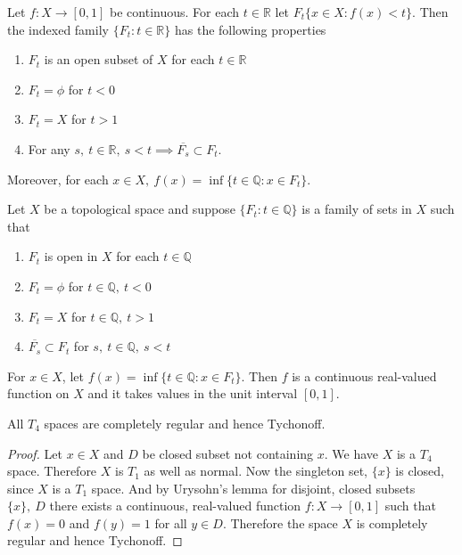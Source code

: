 \begin{lemma}
	Let \( f : X \to [0,1] \) be continuous. For each \( t \in \mathbb{R} \) let \( F_t  \{ x \in X : f(x) < t \} \). Then the indexed family \( \{F_t : t \in \mathbb{R} \} \) has the following properties
	\begin{enumerate}
		\item \( F_t \) is an open subset of \( X \) for each \( t \in \mathbb{R} \)
		\item \( F_t = \phi \) for \( t < 0 \)
		\item \( F_t = X \) for \( t > 1 \)
		\item For any \( s,\ t \in \mathbb{R},\ s < t \implies \overline{F_s} \subset F_t \).
	\end{enumerate}
	Moreover, for each \( x \in X,\ f(x) = \inf \{t \in \mathbb{Q} : x \in F_t \} \).
\end{lemma}

\begin{lemma}
	Let \( X \) be a topological space and suppose \( \{ F_t : t \in \mathbb{Q} \} \) is a family of sets in \( X \) such that 
	\begin{enumerate}
		\item \( F_t \) is open in \( X \) for each \( t \in \mathbb{Q} \)
		\item \( F_t = \phi \) for \( t \in \mathbb{Q},\ t < 0 \)
		\item \( F_t = X \) for \( t \in \mathbb{Q},\ t > 1 \)
		\item \( \overline{F_s} \subset F_t \) for \( s,\ t \in \mathbb{Q},\ s < t \)
	\end{enumerate}
	For \( x \in X \), let \( f(x) = \inf \{ t \in \mathbb{Q} : x \in F_t \} \). Then \( f \) is a continuous real-valued function on \( X \) and it takes values in the unit interval \( [0,1] \).
\end{lemma}

\begin{corollary}
	All \( T_4 \) spaces are completely regular and hence Tychonoff.
\end{corollary}
\begin{proof}
	Let \( x \in X \) and \( D \) be closed subset not containing \( x \). We have \( X \) is a \( T_4 \) space. Therefore \( X \) is \( T_1 \) as well as normal.  Now the singleton set, \( \{ x \} \) is closed, since \( X \) is a \( T_1 \) space. And by Urysohn's lemma for disjoint, closed subsets \( \{ x \},\ D \) there exists a continuous, real-valued function \( f : X \to [0,1] \) such that \( f(x) = 0 \) and \( f(y) = 1 \) for all \( y \in D \). Therefore the space \( X \) is completely regular and hence Tychonoff.
\end{proof}

